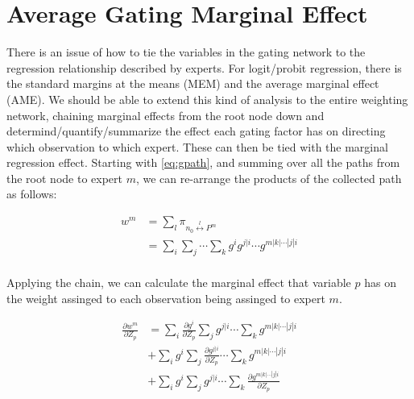 \documentclass[12pt]{article}
\begin{document}
\section{Average Gating Marginal Effect}
There is an issue of how to tie the variables in the gating network to the regression relationship described by experts. For logit/probit regression, there is the standard margins at the means (MEM) and the average marginal effect (AME). We should be able to extend this kind of analysis to the entire weighting network, chaining marginal effects from the root node down and determind/quantify/summarize the effect each gating factor has on directing which observation to which expert. These can then be tied with the marginal regression effect. Starting with \ref{eq:gpath}, and summing over all the paths from the root node to expert $m$, we can re-arrange the products of the collected path as follows:  

\begin{equation}
  \begin{split}
  w^{m} &= \sum_{l} \pi_{n_{0} \overset{l}{\longleftrightarrow} P^{m}} \\
        &= \sum_{i} \sum_{j} \cdots \sum_{k} g^{i} g^{j|i} \cdots g^{m|k|\cdots|j|i} \\
  \end{split}
\end{equation}

Applying the chain, we can calculate the marginal effect that variable $p$ has on the weight assinged to each observation being assinged to expert $m$.

\begin{equation}
  \begin{split}
    \frac{\partial w^{m}}{\partial Z_{p}} &= \sum_{i} \frac{\partial g^{i}}{\partial Z_{p}} \sum_{j} g^{j|i} \cdots \sum_{k} g^{m|k|\cdots|j|i} \\
    &+ \sum_{i} g^{i} \sum_{j} \frac{\partial g^{j|i}}{\partial Z_{p}} \cdots \sum_{k} g^{m|k|\cdots|j|i} \\
    &+ \sum_{i} g^{i} \sum_{j} g^{j|i} \cdots \sum_{k} \frac{\partial g^{m|k|\cdots|j|i}}{\partial Z_{p}} \\
  \end{split}
\end{equation}
\end{document}
